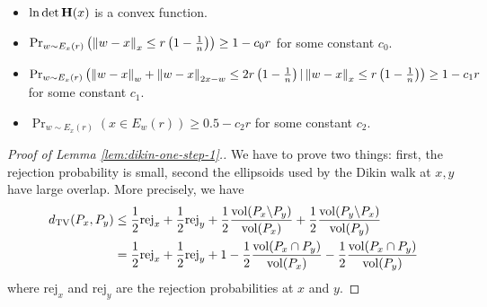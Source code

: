 \begin{itemize}
\item $\ln\det\mathbf{H}(x)$ is a convex function.
\item $\Pr_{w\sim E_{x}(r)}\left(\left\Vert w-x\right\Vert_{x}\le r\left(1-\frac{1}{n}\right)\right)\ge1-c_{0}r$
for some constant $c_{0}$.
\item $\Pr_{w\sim E_{x}(r)}\left(\left\Vert w-x\right\Vert_{w}+\left\Vert w-x\right\Vert_{2x-w}\le2r\left(1-\frac{1}{n}\right)\vert\left\Vert w-x\right\Vert_{x}\le r\left(1-\frac{1}{n}\right)\right)\ge1-c_{1}r$
for some constant $c_{1}$.
\item $\Pr_{w\sim E_{x}(r)}\left(x\in E_{w}(r)\right)\ge0.5-c_{2}r$ for
some constant $c_{2}$.
\end{itemize}
\begin{proof}[Proof of Lemma \ref{lem:dikin-one-step-1}.]
We have to prove two things: first, the rejection probability is
small, second the ellipsoids used by the Dikin walk at $x,y$ have
large overlap. More precisely, we have
\begin{align}
d_{\mathrm{TV}}(P_{x},P_{y}) & \leq\frac{1}{2}\text{rej}_{x}+\frac{1}{2}\text{rej}_{y}+\frac{1}{2}\frac{\mathrm{vol}(P_{x}\backslash P_{y})}{\mathrm{vol}(P_{x})}+\frac{1}{2}\frac{\mathrm{vol}(P_{y}\backslash P_{x})}{\mathrm{vol}(P_{y})}\nonumber \\
 & =\frac{1}{2}\text{rej}_{x}+\frac{1}{2}\text{rej}_{y}+1-\frac{1}{2}\frac{\mathrm{vol}(P_{x}\cap P_{y})}{\mathrm{vol}(P_{x})}-\frac{1}{2}\frac{\mathrm{vol}(P_{x}\cap P_{y})}{\mathrm{vol}(P_{y})}\label{eq:dikin_formula}
\end{align}
where $\text{rej}_{x}$ and $\text{rej}_{y}$ are the rejection probabilities
at $x$ and $y$.


\end{proof}
